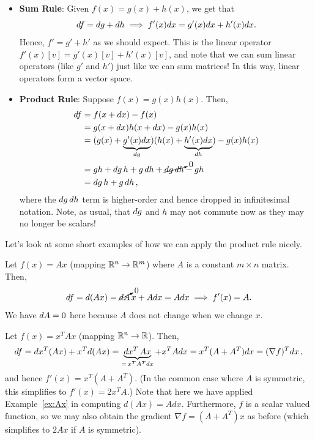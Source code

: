 \begin{itemize}
    \item \textbf{Sum Rule}: Given $f(x) = g(x) + h(x)$, we get that
    \[
d f = d g + d h \implies f'(x) d x = g'(x) d x + h'(x)d x.
    \]
    Hence, $f' = g'+h'$ as we should expect.  This is the linear operator $f'(x)[v] = g'(x)[v] + h'(x)[v]$, and note that we can sum linear operators (like $g'$ and $h'$) just like we can sum matrices! In this way, linear operators form a vector space.
    \item \textbf{Product Rule}: Suppose $f(x) = g(x) h(x)$. Then,
    \begin{align*}
        d f &= f(x+ d x) - f(x) \\
        &= g(x+d x) h(x+d x) - g(x) h(x) \\
        &= (g(x) + \underbrace{g'(x) d x}_{d g}) (h(x) + \underbrace{h'(x)d x}_{d h}) - g(x)h(x) \\
        &= g h + dg\, h + g\,dh + \cancelto{0}{dg \,dh} - gh \\
        &= d g \, h + g \,d h \, ,
    \end{align*}
    where the $d g \, d h$ term is higher-order and hence dropped in infinitesimal notation.
    Note, as usual, that $d g$ and $h$ may not commute now as they may no longer be scalars!
\end{itemize}

Let's look at some short examples of how we can apply the product rule nicely.

\begin{example}\label{ex:Ax}
    Let $f(x) = Ax$ (mapping $\mathbb R^n \to \mathbb R^m$) where $A$ is a constant $m\times n$ matrix. Then,
    \[
    d f = d(Ax) =  \cancelto{0}{d A} \, x + Ad x = Ad x \implies f'(x) = A.
    \]
    We have ${d A} = 0$ here because $A$ does not change when we change $x$.
\end{example}

\begin{example}
    Let $f(x) = x^T A x$ (mapping $\mathbb R^n \to \mathbb R$). Then,
    \[
    d f = d x^T(Ax) + x^T d(Ax) = \underbrace{d x^T \, Ax}_{=\, x^T A^Td x} + x^T Ad x = x^T(A+A^T)d x  = (\nabla f)^T d x\, ,
    \]
    and hence $f'(x) = x^T(A + A^T)$. (In the common case where $A$ is symmetric, this simplifies to $f'(x) = 2x^T A$.) Note that here we have applied Example~\ref{ex:Ax} in computing $d(Ax) = A dx$.
    Furthermore, $f$ is a scalar valued function, so we may also obtain the gradient $\nabla f = (A+A^T) x$ as before (which simplifies to $2Ax$ if $A$ is symmetric).
\end{example}

